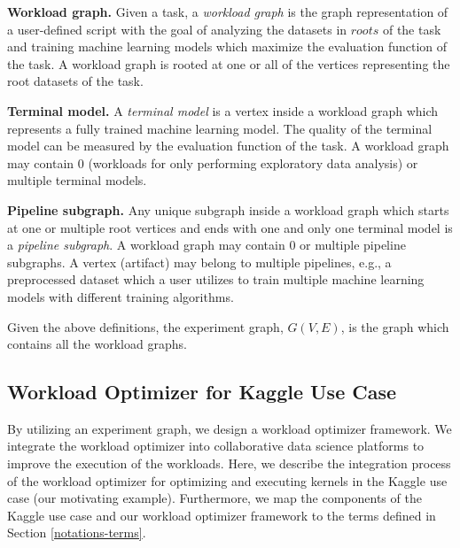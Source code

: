 \textbf{Workload graph.} Given a task, a \textit{workload graph} is the graph representation of a user-defined script with the goal of analyzing the datasets in $roots$ of the task and training machine learning models which maximize the evaluation function of the task.
A workload graph is rooted at one or all of the vertices representing the root datasets of the task.

\textbf{Terminal model.} A \textit{terminal model} is a vertex inside a workload graph which represents a fully trained machine learning model.
The quality of the terminal model can be measured by the evaluation function of the task.
A workload graph may contain $0$ (workloads for only performing exploratory data analysis) or multiple terminal models.

\textbf{Pipeline subgraph.} Any unique subgraph inside a workload graph which starts at one or multiple root vertices and ends with one and only one terminal model is a \textit{pipeline subgraph}.
A workload graph may contain $0$ or multiple pipeline subgraphs.
A vertex (artifact) may belong to multiple pipelines, e.g., a preprocessed dataset which a user utilizes to train multiple machine learning models with different training algorithms.

Given the above definitions, the experiment graph, $G(V, E)$, is the graph which contains all the workload graphs.

\subsection{Workload Optimizer for Kaggle Use Case}
By utilizing an experiment graph, we design a workload optimizer framework.
We integrate the workload optimizer into collaborative data science platforms to improve the execution of the workloads.
Here, we describe the integration process of the workload optimizer for optimizing and executing kernels in the Kaggle use case (our motivating example).
Furthermore, we map the components of the Kaggle use case and our workload optimizer framework to the terms defined in Section \ref{notations-terms}.

